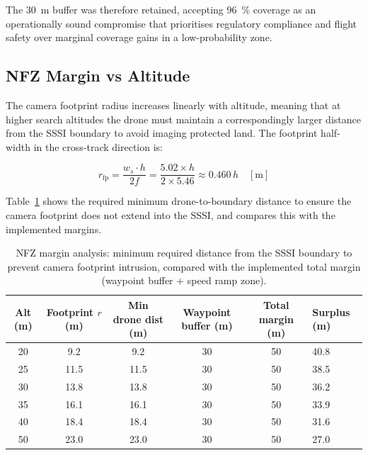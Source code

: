 The \SI{30}{\metre} buffer was therefore retained, accepting \SI{96}{\percent} coverage as an operationally sound compromise that prioritises regulatory compliance and flight safety over marginal coverage gains in a low-probability zone.

\subsection{NFZ Margin vs Altitude}\label{sec:nfz-altitude-old}

The camera footprint radius increases linearly with altitude, meaning that at higher search altitudes the drone must maintain a correspondingly larger distance from the SSSI boundary to avoid imaging protected land. The footprint half-width in the cross-track direction is:

\begin{equation}\label{eq:footprint-half-old}
  r_{\text{fp}} = \frac{w_s \cdot h}{2 f} = \frac{5.02 \times h}{2 \times 5.46} \approx 0.460 \, h \quad [\si{\metre}]
\end{equation}

Table~\ref{tab:nfz-margin-old} shows the required minimum drone-to-boundary distance to ensure the camera footprint does not extend into the SSSI, and compares this with the implemented margins.

\begin{table}[ht]
  \centering\compactTable
  \caption{NFZ margin analysis: minimum required distance from the SSSI boundary to prevent camera footprint intrusion, compared with the implemented total margin (waypoint buffer + speed ramp zone).}\label{tab:nfz-margin-old}
  \begin{tabularx}{\linewidth}{@{}c c c c c X@{}}
    \toprule
    \textbf{Alt (m)} & \textbf{Footprint $r$ (m)} & \textbf{Min drone dist (m)} & \textbf{Waypoint buffer (m)} & \textbf{Total margin (m)} & \textbf{Surplus (m)} \\
    \midrule
    20 & 9.2  & 9.2  & 30 & 50 & 40.8 \\
    25 & 11.5 & 11.5 & 30 & 50 & 38.5 \\
    30 & 13.8 & 13.8 & 30 & 50 & 36.2 \\
    35 & 16.1 & 16.1 & 30 & 50 & 33.9 \\
    40 & 18.4 & 18.4 & 30 & 50 & 31.6 \\
    50 & 23.0 & 23.0 & 30 & 50 & 27.0 \\
    \bottomrule
  \end{tabularx}
\end{table}

